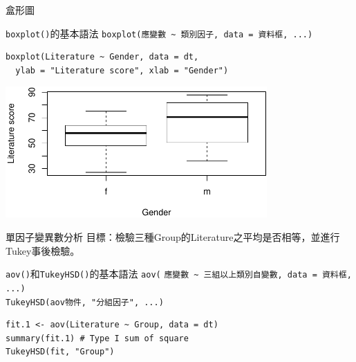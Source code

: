 \documentclass[12pt, aspectratio=43]{beamer}
\begin{document}
\begin{frame}[fragile]{盒形圖}

\begin{block}{\texttt{boxplot()}的基本語法}
\verb+boxplot(應變數 ~ 類別因子, data = 資料框, ...)+
\end{block}

\begin{verbatim}
boxplot(Literature ~ Gender, data = dt, 
  ylab = "Literature score", xlab = "Gender")
\end{verbatim}

\begin{center}
\includegraphics[width=0.75\textwidth]{Rplot-two-group.pdf}
\end{center}
\end{frame}


\begin{frame}[fragile]{單因子變異數分析}
目標：檢驗三種Group的Literature之平均是否相等，並進行Tukey事後檢驗。

\begin{block}{\texttt{aov()}和\texttt{TukeyHSD()}的基本語法}
\verb+aov(+
\verb+應變數 ~ 三組以上類別自變數, data = 資料框, ...)+\\
\verb+TukeyHSD(aov物件, "分組因子", ...)+
\end{block}

\begin{verbatim}
fit.1 <- aov(Literature ~ Group, data = dt)
summary(fit.1) # Type I sum of square
TukeyHSD(fit, "Group")
\end{verbatim}

\end{frame}
\end{document}
